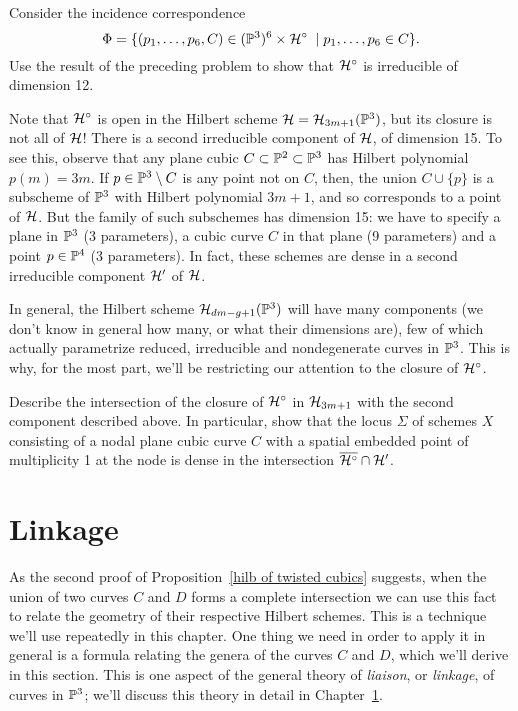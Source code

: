 \begin{exercise}
Consider the incidence correspondence
$$
\Phi = \{ (p_1,\dots,p_6, C) \in (\PP^3)^6 \times \cH^\circ \; \mid p_1,\dots,p_6 \in C  \}.
$$
Use the result of the preceding problem to show that $\cH^\circ$ is irreducible of dimension 12.
\end{exercise}


Note that $\cH^\circ$ is open in the Hilbert scheme $\cH = \cH_{3m+1}(\PP^3)$, but its closure is not all of $\cH$! There is a second irreducible component of $\cH$, of dimension 15. To see this, observe that any plane cubic $C \subset \PP^2 \subset \PP^3$ has Hilbert polynomial $p(m) = 3m$. If $p \in \PP^3 \setminus C$ is any point not on $C$, then, the union $C \cup \{p\}$ is a subscheme of $\PP^3$ with Hilbert polynomial $3m+1$, and so corresponds to a point of $\cH$. But the family of such subschemes has dimension 15: we have to specify a plane in $\PP^3$ (3 parameters), a cubic curve $C$ in that plane (9 parameters) and a point $p \in \PP^4$ (3 parameters). In fact, these schemes are dense in a second irreducible component $\cH'$ of $\cH$.

In general, the Hilbert scheme $\cH_{dm-g+1}(\PP^3)$ will have many components (we don't know in general how many, or what their dimensions are), few of which actually parametrize reduced, irreducible and nondegenerate curves in $\PP^3$. This is why, for the most part, we'll be restricting our attention to the closure of $\cH^\circ$. 

\begin{exercise}
Describe the intersection of the closure  of $\cH^\circ$ in $\cH_{3m+1}$ with the second component described above. In particular, show that the locus $\Sigma$ of schemes $X$ consisting of a nodal plane cubic curve $C$ with a spatial embedded point of multiplicity 1 at the node is dense in the intersection $\overline{\cH^\circ} \cap \cH'$.
\end{exercise}

\section{Linkage} 

As the second proof of Proposition~\ref{hilb of twisted cubics} suggests, when the union of two curves $C$ and $D$ forms a complete intersection we can use this fact to relate the geometry of their respective Hilbert schemes. This is a technique we'll use repeatedly in this chapter. One thing we need in order to apply it in general is a formula relating the genera of the curves $C$ and $D$, which we'll derive in this section. This is one aspect of the general theory of \emph{liaison}, or \emph{linkage}, of curves in $\PP^3$; we'll discuss this theory in detail in Chapter~\ref{}.

